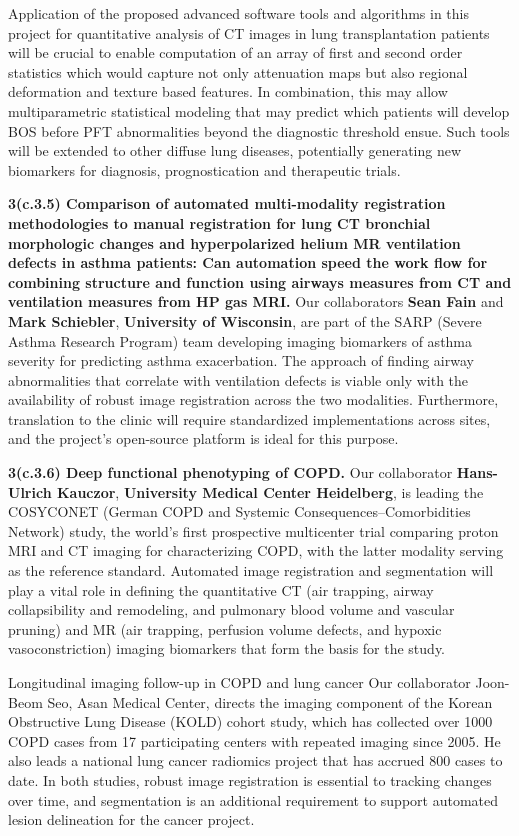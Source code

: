 \documentclass[11pt,]{article}
\begin{document}
Application of the proposed advanced software tools and algorithms in
this project for quantitative analysis of CT images in lung
transplantation patients will be crucial to enable computation of an
array of first and second order statistics which would capture not only
attenuation maps but also regional deformation and texture based
features. In combination, this may allow multiparametric statistical
modeling that may predict which patients will develop BOS before PFT
abnormalities beyond the diagnostic threshold ensue. Such tools will be
extended to other diffuse lung diseases, potentially generating new
biomarkers for diagnosis, prognostication and therapeutic trials.

\textbf{3(c.3.5) Comparison of automated multi-modality registration
methodologies to manual registration for lung CT bronchial morphologic
changes and hyperpolarized helium MR ventilation defects in asthma
patients: Can automation speed the work flow for combining structure and
function using airways measures from CT and ventilation measures from HP
gas MRI.} Our collaborators \textbf{Sean Fain} and \textbf{Mark
Schiebler}, \textbf{University of Wisconsin}, are part of the SARP
(Severe Asthma Research Program) team developing imaging biomarkers of
asthma severity for predicting asthma exacerbation. The approach of
finding airway abnormalities that correlate with ventilation defects is
viable only with the availability of robust image registration across
the two modalities. Furthermore, translation to the clinic will require
standardized implementations across sites, and the project's open-source
platform is ideal for this purpose.

\textbf{3(c.3.6) Deep functional phenotyping of COPD.} Our collaborator
\textbf{Hans-Ulrich Kauczor}, \textbf{University Medical Center
Heidelberg}, is leading the COSYCONET (German COPD and Systemic
Consequences--Comorbidities Network) study, the world's first
prospective multicenter trial comparing proton MRI and CT imaging for
characterizing COPD, with the latter modality serving as the reference
standard. Automated image registration and segmentation will play a
vital role in defining the quantitative CT (air trapping, airway
collapsibility and remodeling, and pulmonary blood volume and vascular
pruning) and MR (air trapping, perfusion volume defects, and hypoxic
vasoconstriction) imaging biomarkers that form the basis for the study.

Longitudinal imaging follow-up in COPD and lung cancer Our collaborator
Joon-Beom Seo, Asan Medical Center, directs the imaging component of the
Korean Obstructive Lung Disease (KOLD) cohort study, which has collected
over 1000 COPD cases from 17 participating centers with repeated imaging
since 2005. He also leads a national lung cancer radiomics project that
has accrued 800 cases to date. In both studies, robust image
registration is essential to tracking changes over time, and
segmentation is an additional requirement to support automated lesion
delineation for the cancer project.
\end{document}
